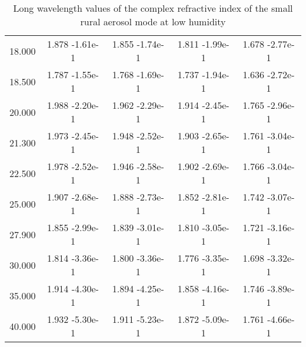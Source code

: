 \documentclass[12pt]{article}
\begin{document}
\begin{center}
\begin{table}
\begin{tabular}{| c | c | c | c | c |  }
18.000  &   1.878 -1.61e-1 &   1.855 -1.74e-1 &   1.811 -1.99e-1 &   1.678 -2.77e-1  \\
18.500   &  1.787 -1.55e-1 &   1.768 -1.69e-1 &   1.737 -1.94e-1 &   1.636 -2.72e-1   \\
20.000 &   1.988 -2.20e-1  &  1.962 -2.29e-1 &   1.914 -2.45e-1  &  1.765 -2.96e-1   \\
21.300 &   1.973 -2.45e-1  &  1.948 -2.52e-1  &  1.903 -2.65e-1  &  1.761 -3.04e-1   \\
22.500 &   1.978 -2.52e-1  &  1.946 -2.58e-1 &   1.902 -2.69e-1 &   1.766 -3.04e-1   \\
25.000 &   1.907 -2.68e-1  &  1.888 -2.73e-1 &   1.852 -2.81e-1 &   1.742 -3.07e-1   \\
27.900 &   1.855 -2.99e-1  &  1.839 -3.01e-1 &   1.810 -3.05e-1 &   1.721 -3.16e-1   \\
30.000 &   1.814 -3.36e-1  &  1.800 -3.36e-1  &  1.776 -3.35e-1  &  1.698 -3.32e-1   \\
35.000 &   1.914 -4.30e-1  &  1.894 -4.25e-1  &  1.858 -4.16e-1  &  1.746 -3.89e-1   \\
40.000 &   1.932 -5.30e-1  &  1.911 -5.23e-1  &  1.872 -5.09e-1  &  1.761 -4.66e-1  \\
\hline
\end{tabular}
\caption{Long wavelength values of the complex refractive index of the small rural aerosol mode at low humidity}
\end{table}
\end{center}
\end{document}
